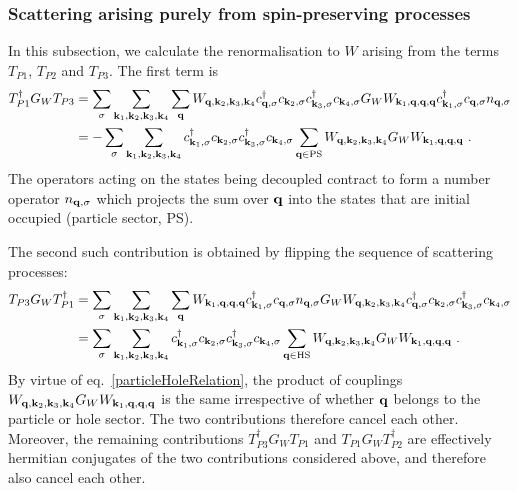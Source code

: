 \subsubsection*{Scattering arising purely from spin-preserving processes}
In this subsection, we calculate the renormalisation to \(W\) arising from the terms \(T_{P1}\), \(T_{P2}\) and \(T_{P3}\). The first term is
\begin{equation}\begin{aligned}
	T_{P1}^\dagger G_W T_{P3} &= \sum_\sigma\sum_{{\bf k}_1, {\bf k}_2, {\bf k}_3, {\bf k}_4} \sum_{\bf q} W_{{\bf q},{\bf k}_2,{\bf k}_3,{\bf k}_4}c^\dagger_{{\bf q},\sigma}c_{{\bf k}_2,\sigma}c^\dagger_{{\bf k}_3,\sigma}c_{{\bf k}_4,\sigma} G_W W_{{\bf k}_1,{\bf q},{\bf q},{\bf q}} c^\dagger_{{\bf k}_1,\sigma}c_{{\bf q},\sigma} n_{{\bf q},\sigma}\\
							  &= -\sum_\sigma\sum_{{\bf k}_1, {\bf k}_2, {\bf k}_3, {\bf k}_4} c^\dagger_{{\bf k}_1,\sigma} c_{{\bf k}_2,\sigma}c^\dagger_{{\bf k}_3,\sigma}c_{{\bf k}_4,\sigma} \sum_{\bf q \in \text{PS}} W_{{\bf q},{\bf k}_2,{\bf k}_3,{\bf k}_4} G_W W_{{\bf k}_1,{\bf q},{\bf q},{\bf q}}~.
\end{aligned}\end{equation}
The operators acting on the states being decoupled contract to form a number operator \(n_{{\bf q},\sigma}\) which projects the sum over \({\bf q}\) into the states that are initial occupied (particle sector, PS). 

The second such contribution is obtained by flipping the sequence of scattering processes:
\begin{equation}\begin{aligned}
	T_{P3} G_W T_{P1}^\dagger &= \sum_\sigma\sum_{{\bf k}_1, {\bf k}_2, {\bf k}_3, {\bf k}_4} \sum_{\bf q} W_{{\bf k}_1,{\bf q},{\bf q},{\bf q}} c^\dagger_{{\bf k}_1,\sigma}c_{{\bf q},\sigma} n_{{\bf q},\sigma} G_W W_{{\bf q},{\bf k}_2,{\bf k}_3,{\bf k}_4}c^\dagger_{{\bf q},\sigma}c_{{\bf k}_2,\sigma}c^\dagger_{{\bf k}_3,\sigma}c_{{\bf k}_4,\sigma} \\
							  &= \sum_\sigma\sum_{{\bf k}_1, {\bf k}_2, {\bf k}_3, {\bf k}_4} c^\dagger_{{\bf k}_1,\sigma} c_{{\bf k}_2,\sigma}c^\dagger_{{\bf k}_3,\sigma}c_{{\bf k}_4,\sigma} \sum_{\bf q \in \text{HS}} W_{{\bf q},{\bf k}_2,{\bf k}_3,{\bf k}_4} G_W W_{{\bf k}_1,{\bf q},{\bf q},{\bf q}}~.
\end{aligned}\end{equation}
By virtue of eq.~\ref{particleHoleRelation}, the product of couplings \(W_{{\bf q},{\bf k}_2,{\bf k}_3,{\bf k}_4} G_W W_{{\bf k}_1,{\bf q},{\bf q},{\bf q}}\) is the same irrespective of whether \({\bf q}\) belongs to the particle or hole sector. The two contributions therefore cancel each other. Moreover, the remaining contributions \(T_{P3}^\dagger G_W T_{P1}\) and \(T_{P1}G_W T_{P2}^\dagger\) are effectively hermitian conjugates of the two contributions considered above, and therefore also cancel each other.


